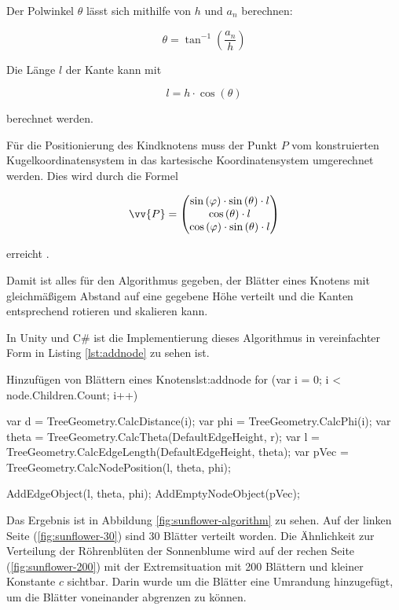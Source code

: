 Der Polwinkel $\theta$ lässt sich mithilfe von $h$ und $a_n$ berechnen:

\begin{equation}
  \theta = \tan^{-1} \left(\frac{a_n}{h}\right)
\end{equation}

Die Länge $l$ der Kante kann mit

\begin{equation}
  l = h \cdot \cos\left(\theta\right)
\end{equation}

berechnet werden.

Für die Positionierung des Kindknotens muss der Punkt $P$ vom konstruierten Kugelkoordinatensystem in das kartesische Koordinatensystem umgerechnet werden. Dies wird durch die Formel

\begin{equation}
  \vv{P} =
  \begin{pmatrix}
    \sin\left(\varphi\right) \cdot \sin\left(\theta\right) \cdot l\\
    \cos\left(\theta\right) \cdot l\\
    \cos\left(\varphi\right) \cdot \sin\left(\theta\right) \cdot l
  \end{pmatrix}
\end{equation}

erreicht \cite{wolfram2017spherical}.

Damit ist alles für den Algorithmus gegeben, der Blätter eines Knotens mit gleichmäßigem Abstand auf eine gegebene Höhe verteilt und die Kanten entsprechend rotieren und skalieren kann.

In Unity und C\# ist die Implementierung dieses Algorithmus in vereinfachter Form in Listing \ref{lst:addnode} zu sehen ist.

\begin{codesnippet}{Hinzufügen von Blättern eines Knotens}{lst:addnode}
for (var i = 0; i < node.Children.Count; i++)
{
    var d = TreeGeometry.CalcDistance(i);
    var phi = TreeGeometry.CalcPhi(i);
    var theta = TreeGeometry.CalcTheta(DefaultEdgeHeight, r);
    var l = TreeGeometry.CalcEdgeLength(DefaultEdgeHeight, theta);
    var pVec = TreeGeometry.CalcNodePosition(l, theta, phi);

    AddEdgeObject(l, theta, phi);
    AddEmptyNodeObject(pVec);
}
\end{codesnippet}

Das Ergebnis ist in Abbildung \ref{fig:sunflower-algorithm} zu sehen. Auf der linken Seite (\ref{fig:sunflower-30}) sind 30 Blätter verteilt worden. Die Ähnlichkeit zur Verteilung der Röhrenblüten der Sonnenblume wird auf der rechen Seite (\ref{fig:sunflower-200}) mit der Extremsituation mit 200 Blättern und kleiner Konstante $c$ sichtbar. Darin wurde um die Blätter eine Umrandung hinzugefügt, um die Blätter voneinander abgrenzen zu können.

